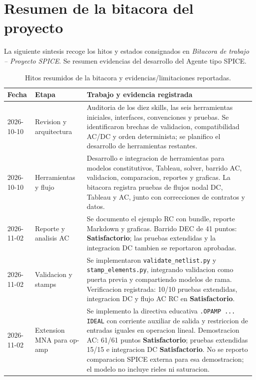 \section{Resumen de la bitacora del proyecto}
La siguiente sintesis recoge los hitos y estados consignados en \textit{Bitacora de trabajo -- Proyecto SPICE}. Se resumen evidencias del desarrollo del Agente tipo SPICE.

\begin{table}[H]
\small
\renewcommand{\arraystretch}{1.2}
\begin{tabularx}{\textwidth}{p{1.7cm} p{2.8cm} X}
\toprule
Fecha & Etapa & Trabajo y evidencia registrada \\
\midrule
2026-10-10 & Revision y arquitectura & Auditoria de los diez skills, las seis herramientas iniciales, interfaces, convenciones y pruebas. Se identificaron brechas de validacion, compatibilidad AC/DC y orden determinista; se planifico el desarrollo de herramientas restantes. \\
2026-10-10 & Herramientas y flujo & Desarrollo e integracion de herramientas para modelos constitutivos, Tableau, solver, barrido AC, validacion, comparacion, reportes y graficas. La bitacora registra pruebas de flujos nodal DC, Tableau y AC, junto con correcciones de contratos y datos. \\
2026-11-02 & Reporte y analisis AC & Se documento el ejemplo RC con bundle, reporte Markdown y graficas. Barrido DEC de 41 puntos: \textbf{Satisfactorio}; las pruebas extendidas y la integracion DC tambien se reportaron aprobadas. \\
2026-11-02 & Validacion y stamps & Se implementaron \texttt{validate\_netlist.py} y \texttt{stamp\_elements.py}, integrando validacion como puerta previa y compartiendo modelos de rama. Verificacion registrada: 10/10 pruebas extendidas, integracion DC y flujo AC RC en \textbf{Satisfactorio}. \\
2026-11-02 & Extension MNA para op-amp & Se implemento la directiva educativa \texttt{.OPAMP ... IDEAL} con corriente auxiliar de salida y restriccion de entradas iguales en operacion lineal. Demostracion AC: 61/61 puntos \textbf{Satisfactorio}; pruebas extendidas 15/15 e integracion DC \textbf{Satisfactorio}. No se reporto comparacion SPICE externa para esa demostracion; el modelo no incluye rieles ni saturacion. \\
\bottomrule
\end{tabularx}
\caption{Hitos resumidos de la bitacora y evidencias/limitaciones reportadas.}
\end{table}